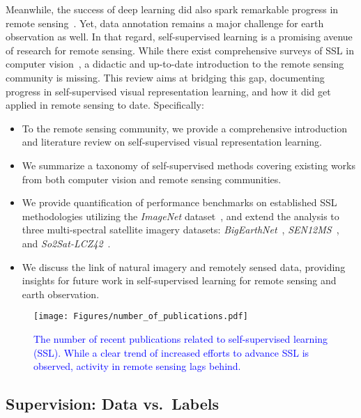 \documentclass[lettersize,journal]{IEEEtran}
\begin{document}
Meanwhile, the success of deep learning did also spark remarkable progress in remote sensing~\cite{zhu2017deep}. Yet, data annotation remains a major challenge for earth observation as well. In that regard, self-supervised learning is a promising avenue of research for remote sensing. While there exist comprehensive surveys of SSL in computer vision~\cite{jing2020self,jaiswal2021survey,liu2021self,ohri2021review}, a didactic and up-to-date introduction to the remote sensing community is missing. This review aims at bridging this gap, documenting progress in self-supervised visual representation learning, and how it did get applied in remote sensing to date. Specifically:
\begin{itemize}
    \item To the remote sensing community, we provide a comprehensive introduction and literature review on self-supervised visual representation learning.
    \item We summarize a taxonomy of self-supervised methods covering existing works from both computer vision and remote sensing communities.
    \item We provide quantification of performance benchmarks on established SSL methodologies utilizing the \textit{ImageNet} dataset~\cite{deng2009imagenet}, and extend the analysis to three multi-spectral satellite imagery datasets: \textit{BigEarthNet}~\cite{sumbul2019bigearthnet}, \textit{SEN12MS}~\cite{schmitt2019sen12ms}, 
    and \textit{So2Sat-LCZ42}~\cite{zhu2019so2sat}.
    \item We discuss the link of natural imagery and remotely sensed data, providing insights for future work in self-supervised learning for remote sensing and earth observation.
\end{itemize}


\begin{figure}
\centering
\texttt{[image: Figures/number\_of\_publications.pdf]}
\caption[number-of-publications]{
\textcolor{blue}{The number of recent publications related to self-supervised learning (SSL). While a clear trend of increased efforts to advance SSL is observed, activity in remote sensing lags behind.}}
\label{fig:number-of-publications}
\end{figure}


\subsection{Supervision: Data vs.\ Labels}
\end{document}
